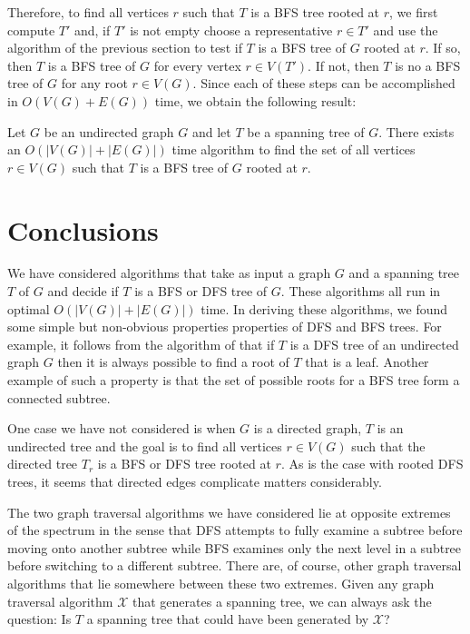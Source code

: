 \documentclass[lotsofwhite]{patmorin}
\begin{document}
Therefore, to find all vertices $r$ such that $T$ is a BFS tree rooted
at $r$, we first compute $T'$ and, if $T'$ is not empty choose a
representative $r\in T'$ and use the algorithm of the previous section
to test if $T$ is a BFS tree of $G$ rooted at $r$. If so, then $T$ is
a BFS tree of $G$ for every vertex $r\in V(T')$.  If not, then $T$ is
no a BFS tree of $G$ for any root $r\in V(G)$.  Since each of these
steps can be accomplished in $O(V(G)+E(G))$ time, we obtain the
following result:

\begin{thm}
Let $G$ be an undirected graph $G$ and let $T$ be a spanning
tree of $G$.  There exists an $O(|V(G)|+|E(G)|)$ time algorithm to find the
set of all vertices $r\in V(G)$ such that $T$ is a BFS tree of $G$
rooted at $r$.  
\end{thm}



\section{Conclusions}

We have considered algorithms that take as input a graph $G$ and a
spanning tree $T$ of $G$ and decide if $T$ is a BFS or DFS tree of
$G$.  These algorithms all run in optimal $O(|V(G)|+|E(G)|)$ time.  In
deriving these algorithms, we found some simple but non-obvious
properties properties of DFS and BFS trees.  For example, it follows
from the algorithm of  that if $T$ is a DFS tree of an
undirected graph $G$ then it is always possible to find a root of $T$
that is a leaf.  Another example of such a property is that the set of
possible roots for a BFS tree form a connected subtree.

One case we have not considered is when $G$ is a directed graph, $T$
is an undirected tree and the goal is to find all vertices $r\in V(G)$
such that the directed tree $T_r$ is a BFS or DFS tree rooted at $r$.
As is the case with rooted DFS trees, it seems that directed edges
complicate matters considerably.

The two graph traversal algorithms we have considered lie at opposite
extremes of the spectrum in the sense that DFS attempts to fully
examine a subtree before moving onto another subtree while BFS
examines only the next level in a subtree before switching to a
different subtree.  There are, of course, other graph traversal
algorithms that lie somewhere between these two extremes.  Given any
graph traversal algorithm $\mathcal{X}$ that generates a spanning
tree, we can always ask the question: Is $T$ a spanning tree that could have
been generated by $\mathcal{X}$?



\end{document}
